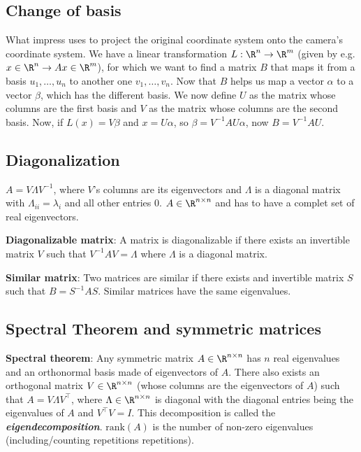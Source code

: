\newsectionNoPB
\subsection{Change of basis}
What impress uses to project the original coordinate system onto the camera's coordinate system.
We have a linear transformation $L: \R^n \rightarrow \R^m$ (given by e.g. $x \in \R^n \rightarrow Ax \in \R^m$), for which we want to find a matrix $B$ that maps it from a basis $u_1, \ldots, u_n$ to another one $v_1, \ldots, v_n$.
Now that $B$ helps us map a vector $\alpha$ to a vector $\beta$, which has the different basis.
We now define $U$ as the matrix whose columns are the first basis and $V$ as the matrix whose columns are the second basis.
Now, if $L(x) = V\beta$ and $x = U\alpha$, so $\beta = V^{-1}AU\alpha$, now $B = V^{-1}AU$.

\subsection{Diagonalization}
\shorttheorem $A = V\Lambda V^{-1}$, where $V$'s columns are its eigenvectors and $\Lambda$ is a diagonal matrix with $\Lambda_{ii} = \lambda_i$ and all other entries $0$. $A \in \R^{n\times n}$ and has to have a complet set of real eigenvectors.

\shortdef \textbf{Diagonalizable matrix}: A matrix is diagonalizable if there exists an invertible matrix $V$ such that $V^{-1}AV = \Lambda$ where $\Lambda$ is a diagonal matrix.

\shortdef \textbf{Similar matrix}: Two matrices are similar if there exists and invertible matrix $S$ such that $B = S^{-1}AS$.
\shortproposition Similar matrices have the same eigenvalues.


\newsectionNoPB
\subsection{Spectral Theorem and symmetric matrices}
\shorttheorem \textbf{Spectral theorem}: Any symmetric matrix $A\in \R^{n \times n}$ has $n$ real eigenvalues and an orthonormal basis made of eigenvectors of $A$.
\shortcorollary There also exists an orthogonal matrix $V \in \R^{n \times n}$ (whose columns are the eigenvectors of $A$) such that $A = V\Lambda V^{\top}$, where $\Lambda \in \R^{n \times n}$ is diagonal with the diagonal entries being the eigenvalues of $A$ and $V^{\top}V = I$. This decomposition is called the \textbf{\textit{eigendecomposition}}.
\setcounter{all}{4}\shortcorollary $\text{rank}(A)$ is the number of non-zero eigenvalues (including/counting repetitions repetitions).


